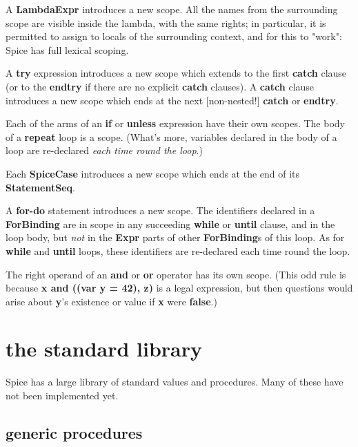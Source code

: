 \documentclass{report}
\begin{document}
A {\bf LambdaExpr} introduces a new scope. All the names from the surrounding
scope are visible inside the lambda, with the same rights; in particular,
it is permitted to assign to locals of the surrounding context, and for this
to "work": Spice has full lexical scoping.

A {\bf try} expression introduces a new scope which extends to the first {\bf catch}
clause (or to the {\bf endtry} if there are no explicit {\bf catch} clauses). A
{\bf catch} clause introduces a new scope which ends at the next {[}non-nested!{]}
{\bf catch} or {\bf endtry}.

Each of the arms of an {\bf if} or {\bf unless} expression have their own scopes. The
body of a {\bf repeat} loop is a scope. (What's more, variables declared
in the body of a loop are re-declared {\em each time round the loop}.)

Each {\bf SpiceCase} introduces a new scope which ends at the end of its
{\bf StatementSeq}.

A {\bf for-do} statement introduces a new scope. The identifiers declared in
a {\bf ForBinding} are in scope in any succeeding {\bf while} or {\bf until} clause, and
in the loop body, but {\em not} in the {\bf Expr} parts of other {\bf ForBinding}s of this
loop. As for {\bf while} and {\bf until} loops, these identifiers are re-declared
each time round the loop.

The right operand of an {\bf and} or {\bf or} operator has its own scope. (This odd
rule is because {\bf x and ((var y = 42), z)} is a legal expression, but then
questions would arise about {\bf y}'s existence or value if {\bf x} were {\bf false}.)\chapter{the standard library}


Spice has a large library of standard values and procedures. Many of these
have not been implemented yet.

\section{generic procedures}
\end{document}
